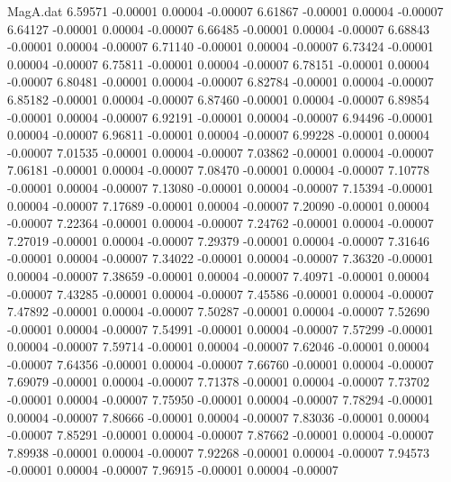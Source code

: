 \begin{filecontents}{MagA.dat}
   6.59571   -0.00001    0.00004   -0.00007
   6.61867   -0.00001    0.00004   -0.00007
   6.64127   -0.00001    0.00004   -0.00007
   6.66485   -0.00001    0.00004   -0.00007
   6.68843   -0.00001    0.00004   -0.00007
   6.71140   -0.00001    0.00004   -0.00007
   6.73424   -0.00001    0.00004   -0.00007
   6.75811   -0.00001    0.00004   -0.00007
   6.78151   -0.00001    0.00004   -0.00007
   6.80481   -0.00001    0.00004   -0.00007
   6.82784   -0.00001    0.00004   -0.00007
   6.85182   -0.00001    0.00004   -0.00007
   6.87460   -0.00001    0.00004   -0.00007
   6.89854   -0.00001    0.00004   -0.00007
   6.92191   -0.00001    0.00004   -0.00007
   6.94496   -0.00001    0.00004   -0.00007
   6.96811   -0.00001    0.00004   -0.00007
   6.99228   -0.00001    0.00004   -0.00007
   7.01535   -0.00001    0.00004   -0.00007
   7.03862   -0.00001    0.00004   -0.00007
   7.06181   -0.00001    0.00004   -0.00007
   7.08470   -0.00001    0.00004   -0.00007
   7.10778   -0.00001    0.00004   -0.00007
   7.13080   -0.00001    0.00004   -0.00007
   7.15394   -0.00001    0.00004   -0.00007
   7.17689   -0.00001    0.00004   -0.00007
   7.20090   -0.00001    0.00004   -0.00007
   7.22364   -0.00001    0.00004   -0.00007
   7.24762   -0.00001    0.00004   -0.00007
   7.27019   -0.00001    0.00004   -0.00007
   7.29379   -0.00001    0.00004   -0.00007
   7.31646   -0.00001    0.00004   -0.00007
   7.34022   -0.00001    0.00004   -0.00007
   7.36320   -0.00001    0.00004   -0.00007
   7.38659   -0.00001    0.00004   -0.00007
   7.40971   -0.00001    0.00004   -0.00007
   7.43285   -0.00001    0.00004   -0.00007
   7.45586   -0.00001    0.00004   -0.00007
   7.47892   -0.00001    0.00004   -0.00007
   7.50287   -0.00001    0.00004   -0.00007
   7.52690   -0.00001    0.00004   -0.00007
   7.54991   -0.00001    0.00004   -0.00007
   7.57299   -0.00001    0.00004   -0.00007
   7.59714   -0.00001    0.00004   -0.00007
   7.62046   -0.00001    0.00004   -0.00007
   7.64356   -0.00001    0.00004   -0.00007
   7.66760   -0.00001    0.00004   -0.00007
   7.69079   -0.00001    0.00004   -0.00007
   7.71378   -0.00001    0.00004   -0.00007
   7.73702   -0.00001    0.00004   -0.00007
   7.75950   -0.00001    0.00004   -0.00007
   7.78294   -0.00001    0.00004   -0.00007
   7.80666   -0.00001    0.00004   -0.00007
   7.83036   -0.00001    0.00004   -0.00007
   7.85291   -0.00001    0.00004   -0.00007
   7.87662   -0.00001    0.00004   -0.00007
   7.89938   -0.00001    0.00004   -0.00007
   7.92268   -0.00001    0.00004   -0.00007
   7.94573   -0.00001    0.00004   -0.00007
   7.96915   -0.00001    0.00004   -0.00007

\end{filecontents}
